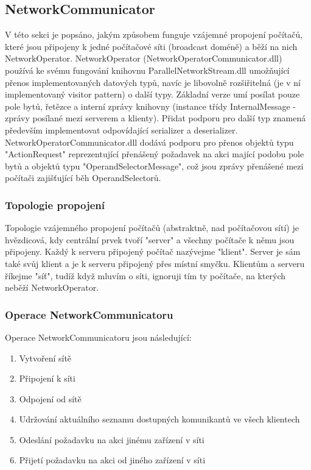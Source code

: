 \documentclass[12pt]{article}
\begin{document}
\subsection{NetworkCommunicator}
V této sekci je popsáno, jakým způsobem funguje vzájemné propojení počítačů, které jsou připojeny k jedné počítačové síti (broadcast doméně) a běží na nich NetworkOperator.
NetworkOperator (NetworkOperatorCommunicator.dll) používá ke svému fungování knihovnu ParallelNetworkStream.dll umožňující přenos implementovaných datových typů, navíc je libovolně rozšiřitelná (je v ní implementovaný visitor pattern) o další typy. Základní verze umí posílat pouze pole bytů, řetězce a interní zprávy knihovny (instance třídy InternalMessage - zprávy posílané mezi serverem a klienty). Přidat podporu pro další typ znamená především implementovat odpovídající serializer a deserializer. NetworkOperatorCommunicator.dll dodává podporu pro přenos objektů typu "ActionRequest" reprezentující přenášený požadavek na akci mající podobu pole bytů a objektů typu "OperandSelectorMessage", což jsou zprávy přenášené mezi počítači zajišťující běh OperandSelectorů.

\subsubsection{Topologie propojení}
Topologie vzájemného propojení počítačů (abstraktně, nad počítačovou sítí) je hvězdicová, kdy centrální prvek tvoří "server" a všechny počítače k němu jsou připojeny. Každý k serveru připojený počítač nazývejme "klient". Server je sám také svůj klient a je k serveru připojený přes místní smyčku. Klientům a serveru říkejme "síť", tudíž když mluvím o síti, ignoruji tím ty počítače, na kterých neběží NetworkOperator.

\subsubsection{Operace NetworkCommunicatoru}
Operace NetworkCommunicatoru jsou následující:
\begin{enumerate}
\item Vytvoření sítě
\item Připojení k síti
\item Odpojení od sítě
\item Udržování aktuálního seznamu dostupných komunikantů ve všech klientech
\item Odeslání požadavku na akci jinému zařízení v síti
\item Přijetí požadavku na akci od jiného zařízení v síti
\end{enumerate}
\end{document}
